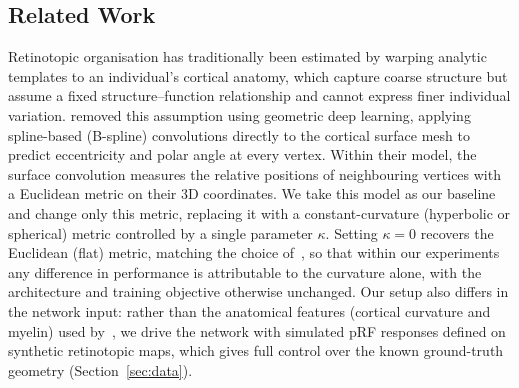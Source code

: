 \subsection{Related Work}
\label{sec:related}

Retinotopic organisation has traditionally been estimated by warping analytic
templates to an individual's cortical anatomy, which capture coarse structure but
assume a fixed structure--function relationship and cannot express finer
individual variation. \citet{ribeiro2021} removed this assumption using geometric
deep learning, applying spline-based (B-spline) convolutions directly to the
cortical surface mesh to predict eccentricity and polar angle at every vertex.
Within their model, the surface convolution measures the relative positions of
neighbouring vertices with a Euclidean metric on their 3D coordinates. We take
this model as our baseline and change only this metric, replacing it with a
constant-curvature (hyperbolic or spherical) metric controlled by a single
parameter $\kappa$. Setting $\kappa = 0$ recovers the Euclidean (flat) metric,
matching the choice of~\citet{ribeiro2021}, so that within our experiments any
difference in performance is attributable to the curvature alone, with the
architecture and training objective otherwise unchanged. Our setup also differs in
the network input: rather than the anatomical features (cortical curvature and
myelin) used by~\citet{ribeiro2021}, we drive the network with simulated pRF
responses defined on synthetic retinotopic maps, which gives full control over the
known ground-truth geometry (Section~\ref{sec:data}).